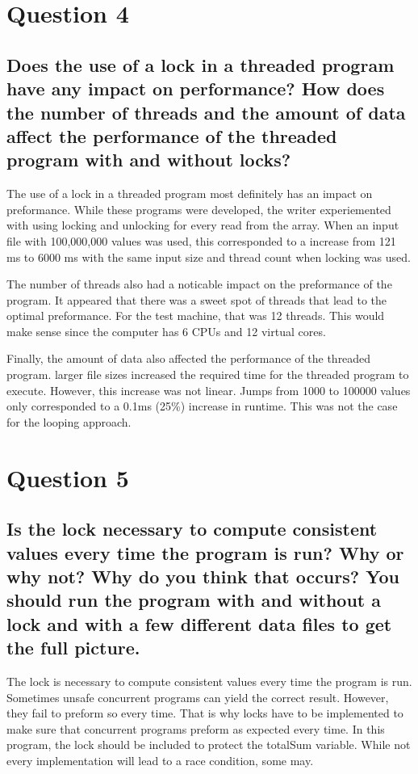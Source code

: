 \documentclass{assignment-x}
\begin{document}
\section{Question 4}
\subsection{Does the use of a lock in a threaded program have any impact on performance? How does the number of threads and the amount of data affect the performance of the threaded program with and without locks?}
The use of a lock in a threaded program most definitely has an impact on preformance. While these programs were developed, the writer experiemented with using locking and unlocking for every read from the array. When an input file with 100,000,000 values was used, this corresponded to a increase from 121 ms to 6000 ms with the same input size and thread count when locking was used. 

The number of threads also had a noticable impact on the preformance of the program. It appeared that there was a sweet spot of threads that lead to the optimal preformance. For the test machine, that was 12 threads. This would make sense since the computer has 6 CPUs and 12 virtual cores.

Finally, the amount of data also affected the performance of the threaded program. larger file sizes increased the required time for the threaded program to execute. However, this increase was not linear. Jumps from 1000 to 100000 values only corresponded to a 0.1ms (25\%) increase in runtime. This was not the case for the looping approach.

\section{Question 5}
\subsection{Is the lock necessary to compute consistent values every time the program is run? Why or why not? Why do you think that occurs? You should run the program with and without a lock and with a few different data files to get the full picture.}
The lock is necessary to compute consistent values every time the program is run. Sometimes unsafe concurrent programs can yield the correct result. However, they fail to preform so every time. That is why locks have to be implemented to make sure that concurrent programs preform as expected every time. In this program, the lock should be included to protect the totalSum variable. While not every implementation will lead to a race condition, some may.
\end{document}
